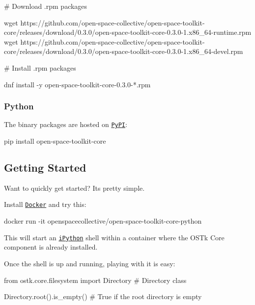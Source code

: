 \begin{DoxyCode}
# Download .rpm packages

wget
       https://github.com/open-space-collective/open-space-toolkit-core/releases/download/0.3.0/open-space-toolkit-core-0.3.0-1.x86\_64-runtime.rpm
wget
       https://github.com/open-space-collective/open-space-toolkit-core/releases/download/0.3.0/open-space-toolkit-core-0.3.0-1.x86\_64-devel.rpm

# Install .rpm packages

dnf install -y open-space-toolkit-core-0.3.0-*.rpm
\end{DoxyCode}


\subsubsection*{Python}

The binary packages are hosted on \href{https://pypi.org/project/open-space-toolkit-core/}{\tt Py\+PI}\+:


\begin{DoxyCode}
pip install open-space-toolkit-core
\end{DoxyCode}


\subsection*{Getting Started}

Want to quickly get started? It\textquotesingle{}s pretty simple.

Install \href{https://www.docker.com/}{\tt Docker} and try this\+:


\begin{DoxyCode}
docker run -it openspacecollective/open-space-toolkit-core-python
\end{DoxyCode}


This will start an \href{https://ipython.org/}{\tt i\+Python} shell within a container where the O\+S\+Tk Core component is already installed.

Once the shell is up and running, playing with it is easy\+:


\begin{DoxyCode}
\textcolor{keyword}{from} ostk.core.filesystem \textcolor{keyword}{import} Directory \textcolor{comment}{# Directory class}

Directory.root().is\_empty() \textcolor{comment}{# True if the root directory is empty}
\end{DoxyCode}



